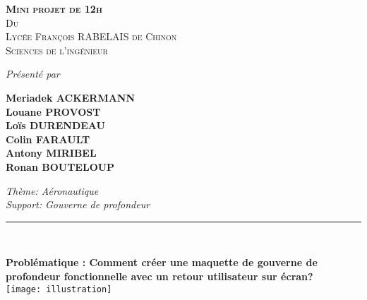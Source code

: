 \documentclass[a4paper, 9pt]{article}
\begin{document}


\begin{center} %

	
	\textsc{\huge\textbf{{Mini projet de 12h\\}}}
	\vspace{.5cm}
	\textsc{\Large	{Du\\}}
	\vspace{.5cm}
	\textsc{\Large	{Lycée François RABELAIS de Chinon\\}}
	\vspace{.5cm}
	\textsc{\large	{Sciences de l'ingénieur}}
	
	\vspace{.5cm}
	
	\large{\textit	{Présenté par}}\\
	
    \bigskip
	
	\huge{\textbf	{Meriadek \textsc{ACKERMANN}\\					
					\bigskip
					Louane \textsc{PROVOST}\\
					\bigskip
					Loïs \textsc{DURENDEAU}\\
					\bigskip
					Colin \textsc{FARAULT}\\
					\bigskip
					Antony \textsc{MIRIBEL}\\
					\bigskip
					Ronan \textsc{BOUTELOUP}}}\\				
				
					\vspace{.5cm}
					
	\textit{\large{	Thème: Aéronautique\\						
					Support: Gouverne de profondeur}}							
				
	\vspace{.15cm}
	\rule{250pt}{0.3mm}\\
	
	\bigskip

	\Large{\textbf{Problématique : Comment créer une maquette de gouverne de profondeur fonctionnelle avec un retour utilisateur sur écran?}}\\	
	\vspace{.3cm}
	\texttt{[image: illustration]}\\	
	

\end{center}
\end{document}
